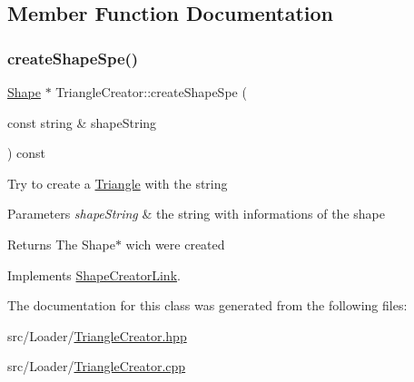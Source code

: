 \subsection{Member Function Documentation}
\hypertarget{class_triangle_creator_a8698d657d98a7be93aeaf86b2434bbb3}{}\label{class_triangle_creator_a8698d657d98a7be93aeaf86b2434bbb3} 
\subsubsection{\texorpdfstring{create\+Shape\+Spe()}{createShapeSpe()}}
{\footnotesize\ttfamily \hyperlink{class_shape}{Shape} $\ast$ Triangle\+Creator\+::create\+Shape\+Spe (\begin{DoxyParamCaption}\item[{const string \&}]{shape\+String }\end{DoxyParamCaption}) const\hspace{0.3cm}{\ttfamily [virtual]}}

Try to create a \hyperlink{class_triangle}{Triangle} with the string 
\begin{DoxyParams}{Parameters}
{\em shape\+String} & the string with informations of the shape \\
\hline
\end{DoxyParams}
\begin{DoxyReturn}{Returns}
The Shape$\ast$ wich were created 
\end{DoxyReturn}


Implements \hyperlink{class_shape_creator_link_a036ecc845946d23b36335e9077308bcf}{Shape\+Creator\+Link}.



The documentation for this class was generated from the following files\+:\begin{DoxyCompactItemize}
\item 
src/\+Loader/\hyperlink{_triangle_creator_8hpp}{Triangle\+Creator.\+hpp}\item 
src/\+Loader/\hyperlink{_triangle_creator_8cpp}{Triangle\+Creator.\+cpp}\end{DoxyCompactItemize}
